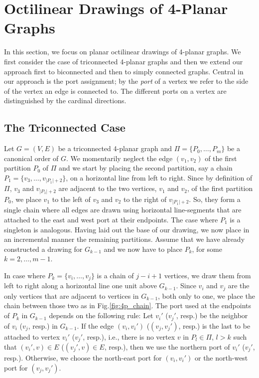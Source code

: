 \documentclass[a4paper,twoside,11pt]{article}
\begin{document}
\section{Octilinear Drawings of 4-Planar Graphs}
\label{sec:4planar}


In this section, we focus on planar octilinear drawings of 4-planar
graphs. We first consider the case of triconnected 4-planar graphs
and then we extend our approach first to biconnected and then to
simply connected graphs. Central in our approach is the port
assignment; by the \emph{port} of a vertex we refer to the side of
the vertex an edge is connected to. The different ports on a vertex
are distinguished by the cardinal directions.

\subsection{The Triconnected Case}
\label{sec:4tricon}


Let $G=(V,E)$ be a triconnected 4-planar graph and $\Pi = \{ P_0,
\ldots, P_m\}$ be a canonical order of $G$. We momentarily neglect
the edge $(v_1,v_2)$ of the first partition $P_0$ of $\Pi$ and we
start by placing the second partition, say a chain $P_1 = \{ v_3,
\ldots, v_{|P_1|+2} \}$, on a horizontal line from left to right.
Since by definition of $\Pi$, $v_3$ and $v_{|P_1|+2}$ are adjacent
to the two vertices, $v_1$ and $v_2$, of the first partition $P_0$,
we place $v_1$ to the left of $v_3$ and $v_2$ to the right of
$v_{|P_1|+2}$. So, they form a single chain where all edges are
drawn using horizontal line-segments that are attached to the east
and west port at their endpoints. The case where $P_1$ is a
singleton is analogous. Having laid out the base of our drawing, we
now place in an incremental manner the remaining partitions. Assume
that we have already constructed a drawing for $G_{k-1}$ and we now
have to place $P_k$, for some $k=2,\ldots,m-1$.

In case where $P_k = \{ v_i, \ldots, v_j \}$ is a chain of $j - i +
1$ vertices, we draw them from left to right along a horizontal line
one unit above $G_{k-1}$. Since $v_i$ and $v_j$ are the only
vertices that are adjacent to vertices in $G_{k-1}$, both only to
one, we place the chain between those two as in
Fig.\ref{fig:4p_chain}. The port used at the endpoints of $P_k$ in
$G_{k-1}$ depends on the following rule: Let $v_{i}'$ ($v_{j}'$,
resp.) be the neighbor of $v_i$ ($v_j$, resp.) in $G_{k-1}$. If the
edge $(v_i, v_i')$ ($(v_j, v_j')$, resp.) is the last to be attached
to vertex $v_i'$ ($v_j'$, resp.), i.e., there is no vertex $v$ in
$P_l \in \Pi$, $l > k$ such that $(v_i',v) \in E$ ($(v_j',v) \in E$,
resp.), then we use the northern port of $v_{i}'$ ($v_{j}'$, resp.).
Otherwise, we choose the north-east port for $(v_i, v_i')$ or the
north-west port for $(v_j, v_j')$.
\end{document}
